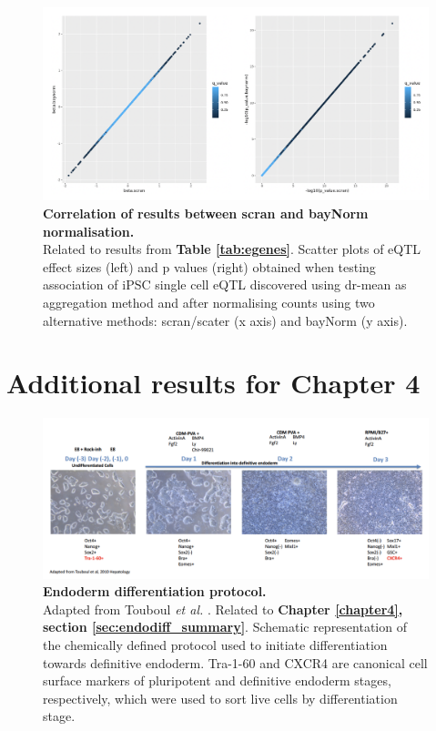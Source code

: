 \begin{figure}[h]
    \centering
    \includegraphics[width=16cm]{Appendix2/Fig/suppl_scran_vs_baynorm.png}
    \caption[Correlation of results between scran and bayNorm normalisation]{\textbf{Correlation of results between scran and bayNorm normalisation.}\\
    Related to results from \textbf{Table \ref{tab:egenes}}.
    Scatter plots of eQTL effect sizes (left) and p values (right) obtained when testing association of iPSC single cell eQTL discovered using dr-mean as aggregation method and after normalising counts using two alternative methods: scran/scater \cite{mccarthy2017scater} (x axis) and bayNorm \cite{tang2020baynorm} (y axis).}
    \label{suppl_fig:scran_vs_baynorm}
\end{figure}

\clearpage

\section{Additional results for Chapter 4}

\begin{figure}[h]
    \centering
    \includegraphics[width=16cm]{Appendix2/Fig/suppl_protocol.png}
    \caption[Endoderm differentiation protocol]{\textbf{Endoderm differentiation protocol.}\\
    Adapted from Touboul \textit{et al.} \cite{touboul2010generation}.
    Related to \textbf{Chapter \ref{chapter4}, section \ref{sec:endodiff_summary}}.
    Schematic representation of the chemically defined protocol used to initiate differentiation towards  definitive endoderm. 
    Tra-1-60 and CXCR4 are canonical cell surface markers of pluripotent and definitive endoderm stages, respectively, which were used to sort live cells by differentiation stage. }
    \label{suppl_fig:endodiff_exp_protocol}
\end{figure}

